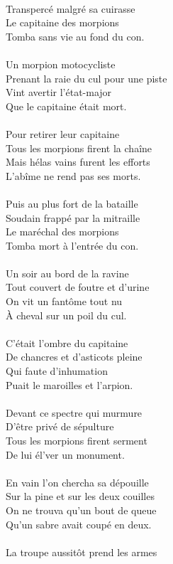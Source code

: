 \\Transpercé malgré sa cuirasse
\\Le capitaine des morpions
\\Tomba sans vie au fond du con.
\\\\Un morpion motocycliste
\\Prenant la raie du cul pour une piste
\\Vint avertir l'état-major
\\Que le capitaine était mort.
\\\\Pour retirer leur capitaine
\\Tous les morpions firent la chaîne
\\Mais hélas vains furent les efforts
\\L'abîme ne rend pas ses morts.
\\\\Puis au plus fort de la bataille
\\Soudain frappé par la mitraille
\\Le maréchal des morpions
\\Tomba mort à l'entrée du con.
\\\\Un soir au bord de la ravine
\\Tout couvert de foutre et d'urine
\\On vit un fantôme tout nu
\\À cheval sur un poil du cul.
\\\\C'était l'ombre du capitaine
\\De chancres et d'asticots pleine
\\Qui faute d'inhumation
\\Puait le maroilles et l'arpion.
\\\\Devant ce spectre qui murmure
\\D'être privé de sépulture
\\Tous les morpions firent serment
\\De lui él'ver un monument.
\\\\En vain l'on chercha sa dépouille
\\Sur la pine et sur les deux couilles
\\On ne trouva qu'un bout de queue
\\Qu'un sabre avait coupé en deux.
\breakpage
\\\\La troupe aussitôt prend les armes
